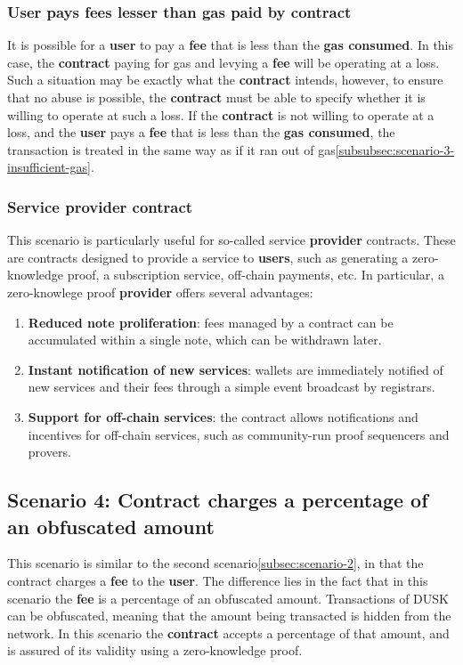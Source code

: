 \documentclass[twocolumn, nofootinbib]{revtex4-2} %
\newcommand{\dusk}{{\footnotesize\textsf{DUSK}}\xspace}
\newcommand{\emphasize}[1]{\textbf{#1}\xspace}
\newcommand{\contract}{\emphasize{contract}}
\newcommand{\fee}{\emphasize{fee}}
\newcommand{\gasconsumed}{\emphasize{gas consumed}}
\newcommand{\provider}{\emphasize{provider}}
\newcommand{\user}{\emphasize{user}}
\newcommand{\users}{\emphasize{users}}
\begin{document}
    \subsubsection*{User pays fees lesser than gas paid by contract}\label{subsubsec:scenario-3-user-pays-fees-lesser}
    It is possible for a \user to pay a \fee that is less than the \gasconsumed.
    In this case, the \contract paying for gas and levying a \fee will be
    operating at a loss.
    Such a situation may be exactly what the \contract intends, however, to
    ensure that no abuse is possible, the \contract must be able to specify
    whether it is willing to operate at such a loss.
    If the \contract is not willing to operate at a loss, and the \user pays
    a \fee that is less than the \gasconsumed, the transaction is treated in
    the same way as if it ran out of gas\ref{subsubsec:scenario-3-insufficient-gas}.

    \subsubsection*{Service provider contract}\label{subsubsec:scenario-3-service-provider-contract}
    This scenario is particularly useful for so-called service \provider contracts.
    These are contracts designed to provide a service to \users, such as
    generating a zero-knowledge proof, a subscription service, off-chain
    payments, etc.
    In particular, a zero-knowlege proof \provider offers several advantages:

    \begin{enumerate}
        \item \textbf{Reduced note proliferation}: fees managed by a contract
        can be accumulated within a single note, which can be withdrawn
        later.
        \item \textbf{Instant notification of new services}: wallets are
        immediately notified of new services and their fees through a
        simple event broadcast by registrars.
        \item \textbf{Support for off-chain services}: the contract allows
        notifications and incentives for off-chain services, such as
        community-run proof sequencers and provers.
    \end{enumerate}

    \subsection*{Scenario 4: Contract charges a percentage of an obfuscated amount}\label{subsec:scenario-4}
    This scenario is similar to the second scenario\ref{subsec:scenario-2}, in
    that the contract charges a \fee to the \user.
    The difference lies in the fact that in this scenario the \fee is a
    percentage of an obfuscated amount.
    Transactions of \dusk can be obfuscated, meaning that the amount being
    transacted is hidden from the network.
    In this scenario the \contract accepts a percentage of that amount, and
    is assured of its validity using a zero-knowledge proof.
\end{document}
